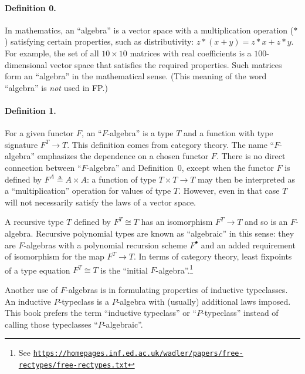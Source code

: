 \paragraph{Definition 0.}

In mathematics, an \textquotedblleft algebra\textquotedblright{} is
a vector space with a multiplication operation ($*$) satisfying certain
properties, such as distributivity: $z*(x+y)=z*x+z*y$. For example,
the set of all $10\times10$ matrices with real coefficients is a
$100$-dimensional vector space that satisfies the required properties.
Such matrices form an \textquotedblleft algebra\textquotedblright{}
in the mathematical sense. (This meaning of the word \textsf{``}algebra\textsf{''}
is \emph{not} used in FP.)

\paragraph{Definition 1.}

For a given functor $F$, an \textsf{``}$F$-algebra\textsf{''}
is a type $T$ and a function with type signature $F^{T}\rightarrow T$.
This definition comes from category theory. The name \textsf{``}$F$-algebra\textsf{''}
emphasizes the dependence on a chosen functor $F$. There is no direct
connection between \textsf{``}$F$-algebra\textsf{''} and Definition~0, except when
the functor $F$ is defined by $F^{A}\triangleq A\times A$: a function
of type $T\times T\rightarrow T$ may then be interpreted as a \textsf{``}multiplication\textsf{''}
operation for values of type $T$. However, even in that case $T$
will not necessarily satisfy the laws of a vector space.

A recursive type $T$ defined by $F^{T}\cong T$ has an isomorphism
$F^{T}\rightarrow T$ and so is an $F$-algebra. Recursive polynomial
types are known as \textsf{``}algebraic\textsf{''} in this sense: they are $F$-algebras
with a polynomial recursion scheme $F^{\bullet}$ and an added requirement
of isomorphism for the map $F^{T}\rightarrow T$. In terms of category
theory, least fixpoints of a type equation $F^{T}\cong T$ is the
\textsf{``}initial $F$-algebra\textsf{''}.\footnote{See \texttt{\href{https://homepages.inf.ed.ac.uk/wadler/papers/free-rectypes/free-rectypes.txt}{https://homepages.inf.ed.ac.uk/wadler/papers/free-rectypes/free-rectypes.txt}} }

Another use of $F$-algebras is in formulating properties of inductive
typeclasses.
An inductive $P$-typeclass is a $P$-algebra with (usually) additional
laws imposed. This book prefers the term \textsf{``}inductive typeclass\textsf{''}
or \textsf{``}$P$-typeclass\textsf{''} instead of calling those typeclasses \textsf{``}$P$-algebraic\textsf{''}.

